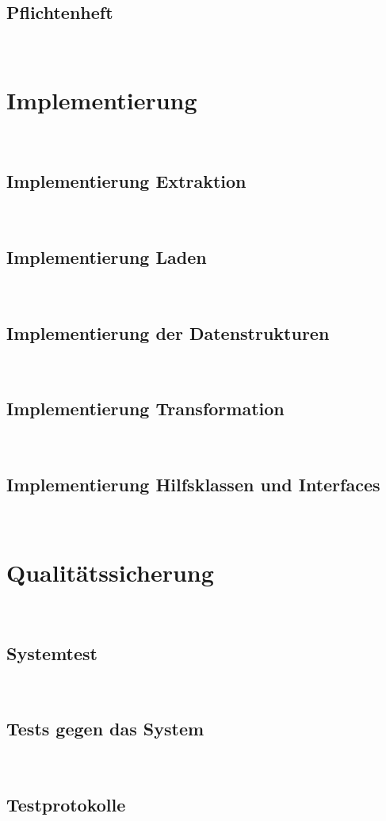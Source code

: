 \documentclass[11pt,toc=sectionentrywithoutdots, 
headheight=44pt, headings=optiontoheadandtoc, hyperfootnotes=false, hypertexnames=false]{scrartcl}
\begin{document}
\subsection{Pflichtenheft}
\blindtext\

\section{Implementierung}
\blindtext\

\subsection{Implementierung Extraktion}
\blindtext\

\subsection{Implementierung Laden}
\blindtext\

\subsection{Implementierung der Datenstrukturen}
\blindtext\

\subsection{Implementierung Transformation}
\blindtext\

\subsection{Implementierung Hilfsklassen und Interfaces}
\blindtext\

\section{Qualitätssicherung}
\blindtext\

\subsection{Systemtest}
\blindtext\

\subsection{Tests gegen das System}
\blindtext\

\subsection{Testprotokolle}
\blindtext\
\end{document}
